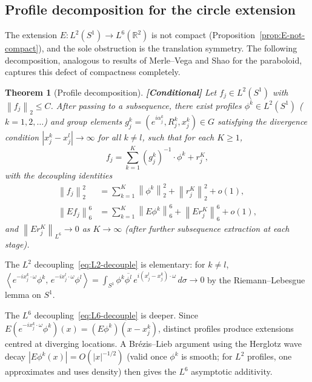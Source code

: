 \documentclass[12pt]{article}
\newtheorem{theorem}{Theorem}[section]
\theoremstyle{definition}
\theoremstyle{remark}
\newcommand{\R}{\mathbb{R}}
\newcommand{\norm}[1]{\left\|#1\right\|}
\newcommand{\ip}[2]{\left\langle #1,\, #2\right\rangle}
\newcommand{\conditional}{\textbf{\color{orange}[Conditional]}}
\begin{document}
\subsection{Profile decomposition for the circle extension}

The extension $E:L^2(S^1)\to L^6(\R^2)$ is not compact
(Proposition~\ref{prop:E-not-compact}), and the sole obstruction is
the translation symmetry.  The following decomposition, analogous to
results of Merle--Vega and Shao for the paraboloid, captures this
defect of compactness completely.

\begin{theorem}[Profile decomposition]
  \label{thm:profile-decomp}
  \conditional\quad
  Let $f_j\in L^2(S^1)$ with $\norm{f_j}_2\leq C$.  After passing
  to a subsequence, there exist profiles $\phi^k\in L^2(S^1)$
  ($k=1,2,\ldots$) and group elements
  $g_j^k=(e^{i\alpha_j^k},R_j^k,x_j^k)\in G$ satisfying the
  \emph{divergence condition}
  $|x_j^k-x_j^l|\to\infty$ for all $k\neq l$,
  such that for each $K\geq 1$,
  \begin{equation}\label{eq:profile-decomp}
    f_j = \sum_{k=1}^K(g_j^k)^{-1}\cdot\phi^k + r_j^K,
  \end{equation}
  with the decoupling identities
  \begin{align}
    \norm{f_j}_2^2
    &= \textstyle\sum_{k=1}^K\norm{\phi^k}_2^2
      + \norm{r_j^K}_2^2 + o(1),
    \label{eq:L2-decouple}\\
    \norm{Ef_j}_6^6
    &= \textstyle\sum_{k=1}^K\norm{E\phi^k}_6^6
      + \norm{Er_j^K}_6^6 + o(1),
    \label{eq:L6-decouple}
  \end{align}
  and $\norm{Er_j^K}_{L^6}\to 0$ as $K\to\infty$ (after further
  subsequence extraction at each stage).
\end{theorem}

The $L^2$ decoupling~\eqref{eq:L2-decouple} is elementary:
for $k\neq l$,
$\ip{e^{-ix_j^k\cdot\omega}\phi^k}{e^{-ix_j^l\cdot\omega}\phi^l}
=\int_{S^1}\phi^k\overline{\phi^l}\,
e^{i(x_j^l-x_j^k)\cdot\omega}\,d\sigma\to 0$
by the Riemann--Lebesgue lemma on $S^1$.

The $L^6$ decoupling~\eqref{eq:L6-decouple} is deeper.  Since
$E(e^{-ix_j^k\cdot\omega}\phi^k)(x)=(E\phi^k)(x-x_j^k)$, distinct
profiles produce extensions centred at diverging locations.  A
Br\'ezis--Lieb argument using the Herglotz wave decay
$|E\phi^k(x)|=O(|x|^{-1/2})$ (valid once $\phi^k$ is smooth;
for $L^2$ profiles, one approximates and uses density) then gives the
$L^6$ asymptotic additivity.
\end{document}
